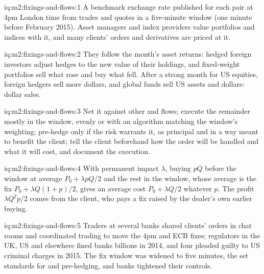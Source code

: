 \begin{solution}{iq:m2:fixings-and-flows:1}
A benchmark exchange rate published for each pair at 4pm London time from trades
and quotes in a five-minute window (one minute before February 2015). Asset
managers and index providers value portfolios and indices with it, and many
clients' orders and derivatives are priced at it.
\end{solution}

\begin{solution}{iq:m2:fixings-and-flows:2}
They follow the month's asset returns: hedged foreign investors adjust hedges to
the new value of their holdings, and fixed-weight portfolios sell what rose and
buy what fell. After a strong month for US equities, foreign hedgers sell more
dollars, and global funds sell US assets and dollars: dollar sales.
\end{solution}

\begin{solution}{iq:m2:fixings-and-flows:3}
Net it against other  and flows; execute the remainder mostly in the
window, evenly or with an algorithm matching the window's weighting; pre-hedge
only if the risk warrants it, as principal and in a way meant to benefit the
client; tell the client beforehand how the order will be handled and what it
will cost, and document the execution.
\end{solution}

\begin{solution}{iq:m2:fixings-and-flows:4}
With permanent impact $\lambda$, buying $pQ$ before the window at average
$P_0 + \lambda pQ/2$ and the rest in the window, whose average is the fix
$P_0 + \lambda Q(1+p)/2$, gives an average cost $P_0 + \lambda Q/2$ whatever $p$.
The profit $\lambda Q^2 p/2$ comes from the client, who pays a fix raised by the
dealer's own earlier buying.
\end{solution}

\begin{solution}{iq:m2:fixings-and-flows:5}
Traders at several banks shared clients' orders in chat rooms and coordinated
trading to move the 4pm and ECB fixes; regulators in the UK, US and elsewhere
fined banks billions in 2014, and four pleaded guilty to US criminal charges in
2015. The fix window was widened to five minutes, the  set
standards for  and pre-hedging, and banks tightened their controls.
\end{solution}

